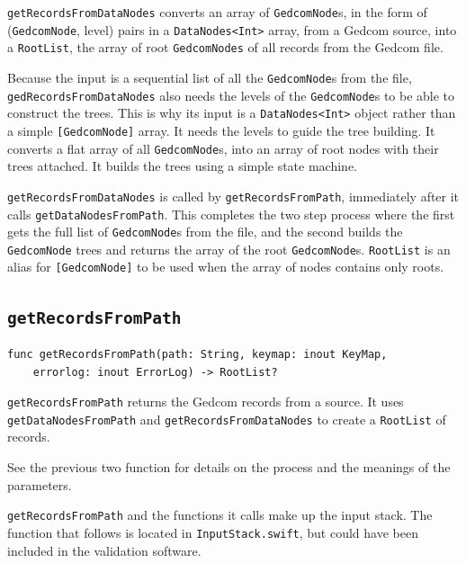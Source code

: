 \texttt{getRecordsFromDataNodes} converts an array of
\texttt{GedcomNode}s, in the form of (\texttt{GedcomNode}, level)
pairs in a \texttt{DataNodes<Int>} array, from a Gedcom source,
into a \texttt{RootList}, the array of root
\texttt{GedcomNodes} of all records from the Gedcom file.

Because the input is a sequential list of all the \texttt{GedcomNode}s
from the file, \texttt{gedRecordsFromDataNodes} also needs the levels
of the \texttt{GedcomNode}s to be able to construct the trees.
This is why its input is a \texttt{DataNodes<Int>} object rather
than a simple \texttt{[GedcomNode]} array. It needs the levels to
guide the tree building.
It converts a flat array of all \texttt{GedcomNode}s, into an array
of root nodes with their trees attached.
It builds the trees using a simple state machine.

\texttt{getRecordsFromDataNodes} is called by
\texttt{getRecordsFromPath},
immediately after it calls \texttt{get\-Data\-Nodes\-From\-Path}.
This completes the two step process where the first gets the
full list of
\texttt{GedcomNode}s
from the file, and the second builds the \texttt{GedcomNode} trees
and returns the array of the root \texttt{GedcomNode}s.
\texttt{RootList} is an alias for \texttt{[GedcomNode]}
to be used when the array of nodes contains only roots.

%
%

\subsection{\texttt{getRecordsFromPath}}

\begin{verbatim}
func getRecordsFromPath(path: String, keymap: inout KeyMap,
    errorlog: inout ErrorLog) -> RootList?
\end{verbatim}
\texttt{getRecordsFromPath} returns the Gedcom records from a source. It uses
\texttt{getDataNodesFromPath} and \texttt{getRecordsFromDataNodes} to
create a \texttt{RootList} of records.

See the previous two function for details on the process and the
meanings of the parameters.

\texttt{getRecordsFromPath} and the functions it calls make up
the input stack.
The function that follows is located in
\texttt{InputStack.swift}, but could
have been included in the validation software.


